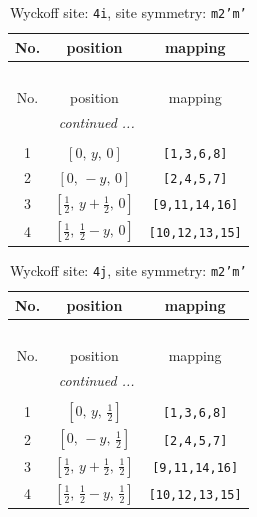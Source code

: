 \documentclass[fleqn,8pt]{jsarticle}
\begin{document}
\renewcommand{\arraystretch}{1.2}
\begin{longtable}{ccc}
\caption{Wyckoff site: {\tt 4i}, site symmetry: {\tt m2'm'}}
 \\
 \hline \hline
No. & position & mapping \\ \hline \endfirsthead

\multicolumn{2}{l}{\tablename\ \thetable{}} \\
 \hline \hline
No. & position & mapping \\ \hline \endhead

 \hline \hline
\multicolumn{2}{r}{\footnotesize\it continued ...} \\ \endfoot

 \hline \hline
\multicolumn{2}{r}{} \\ \endlastfoot

1 & $\left[ 0,\, y,\, 0 \right]$ & {\tt [1,3,6,8]} \\ \hline
2 & $\left[ 0,\, - y,\, 0 \right]$ & {\tt [2,4,5,7]} \\ \hline
3 & $\left[ \frac{1}{2},\, y + \frac{1}{2},\, 0 \right]$ & {\tt [9,11,14,16]} \\ \hline
4 & $\left[ \frac{1}{2},\, \frac{1}{2} - y,\, 0 \right]$ & {\tt [10,12,13,15]} \\
\end{longtable}
\renewcommand{\arraystretch}{1.2}
\begin{longtable}{ccc}
\caption{Wyckoff site: {\tt 4j}, site symmetry: {\tt m2'm'}}
 \\
 \hline \hline
No. & position & mapping \\ \hline \endfirsthead

\multicolumn{2}{l}{\tablename\ \thetable{}} \\
 \hline \hline
No. & position & mapping \\ \hline \endhead

 \hline \hline
\multicolumn{2}{r}{\footnotesize\it continued ...} \\ \endfoot

 \hline \hline
\multicolumn{2}{r}{} \\ \endlastfoot

1 & $\left[ 0,\, y,\, \frac{1}{2} \right]$ & {\tt [1,3,6,8]} \\ \hline
2 & $\left[ 0,\, - y,\, \frac{1}{2} \right]$ & {\tt [2,4,5,7]} \\ \hline
3 & $\left[ \frac{1}{2},\, y + \frac{1}{2},\, \frac{1}{2} \right]$ & {\tt [9,11,14,16]} \\ \hline
4 & $\left[ \frac{1}{2},\, \frac{1}{2} - y,\, \frac{1}{2} \right]$ & {\tt [10,12,13,15]} \\
\end{longtable}
\end{document}

